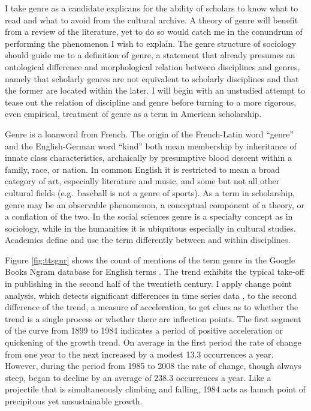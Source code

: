 \documentclass[]{book}
\theoremstyle{definition}
\theoremstyle{definition}
\theoremstyle{definition}
\theoremstyle{remark}
\begin{document}
I take genre as a candidate explicans for the ability of scholars to
know what to read and what to avoid from the cultural archive. A theory
of genre will benefit from a review of the literature, yet to do so
would catch me in the conundrum of performing the phenomenon I wish to
explain. The genre structure of sociology should guide me to a
definition of genre, a statement that already presumes an ontological
difference and morphological relation between disciplines and genres,
namely that scholarly genres are not equivalent to scholarly disciplines
and that the former are located within the later. I will begin with an
unstudied attempt to tease out the relation of discipline and genre
before turning to a more rigorous, even empirical, treatment of genre as
a term in American scholarship.

Genre is a loanword from French. The origin of the French-Latin word
``genre'' and the English-German word ``kind'' both mean membership by
inheritance of innate class characteristics, archaically by presumptive
blood descent within a family, race, or nation. In common English it is
restricted to mean a broad category of art, especially literature and
music, and some but not all other cultural fields (e.g.~baseball is not
a genre of sports). As a term in scholarship, genre may be an observable
phenomenon, a conceptual component of a theory, or a conflation of the
two. In the social sciences genre is a specialty concept as in
sociology, while in the humanities it is ubiquitous especially in
cultural studies. Academics define and use the term differently between
and within disciplines.

Figure \ref{fig:ttsgnr} shows the count of mentions of the term genre in
the Google Books Ngram database for English terms
\citep{Michel2011Quantitative}. The trend exhibits the typical take-off
in publishing in the second half of the twentieth century. I apply
change point analysis, which detects significant differences in time
series data \citep{Matteson2013Nonparametric, James2019ecp}, to the
second difference of the trend, a measure of acceleration, to get clues
as to whether the trend is a single process or whether there are
inflection points. The first segment of the curve from 1899 to 1984
indicates a period of positive acceleration or quickening of the growth
trend. On average in the first period the rate of change from one year
to the next increased by a modest 13.3 occurrences a year. However,
during the period from 1985 to 2008 the rate of change, though always
steep, began to decline by an average of 238.3 occurrences a year. Like
a projectile that is simultaneously climbing and falling, 1984 acts as
launch point of precipitous yet unsustainable growth.
\end{document}
